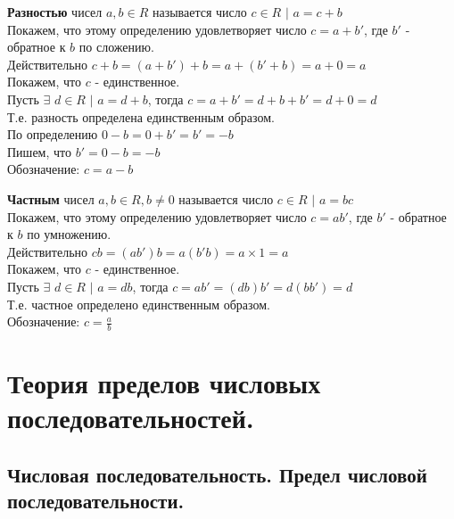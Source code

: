 \documentclass[12pt]{article}
\begin{document}
    \noindent \textbf{Разностью} чисел $a,b \in R$ называется число $c \in R$ $|$ $a = c+b$\\
    Покажем, что этому определению удовлетворяет число $c = a + b'$, где $b'$ - обратное к $b$ по сложению.\\
    Действительно $c + b = (a + b') + b = a + (b' + b) = a + 0 = a$\\
    Покажем, что $c$ - единственное.\\
    Пусть $\exists$ $d \in R$ $|$ $a = d + b$, тогда $c = a + b' = d + b + b' = d + 0 = d$\\
    Т.е. разность определена единственным образом.\\
    По определению $0-b = 0+b' = b' = -b$\\
    Пишем, что $b' = 0 - b = -b$\\
    Обозначение: $c = a - b$\par\noindent
    \textbf{Частным} чисел $a,b \in R, b \ne 0$ называется число $c \in R$ $|$ $a = bc$\\
    Покажем, что этому определению удовлетворяет число $c = ab'$, где $b'$ - обратное к $b$ по умножению.\\
    Действительно $cb = (ab')b = a(b'b) = a \times 1 = a$\\
    Покажем, что $c$ - единственное.\\
    Пусть $\exists$ $d \in R$ $|$ $a = db$, тогда $c = ab' = (db)b' = d(bb') = d$\\
    Т.е. частное определено единственным образом.\\
    Обозначение: $c = \frac{a}{b}$

    \section{Теория пределов числовых последовательностей.}

    \subsection{Числовая последовательность. Предел числовой последовательности.}
\end{document}
